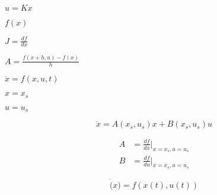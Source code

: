 \documentclass{article}
\begin{document}
$ u = K x $
\pagebreak

$ f(x) $
\pagebreak

$ J = \frac{df}{dx} $
\pagebreak

$ A = \frac{f(x+h,u) - f(x)}{h} $
\pagebreak

$ \dot{x} = f(x,u,t) $
\pagebreak

$ x=x_s $
\pagebreak

$ u=u_s $
\pagebreak

\[ \dot{x} = A(x_s, u_s) x + B(x_s, u_s) u \]
\pagebreak

\[ \begin{aligned} A &= \frac{df}{dx} |_{x=x_s, u=u_s} \\ B &= \frac{df}{du} |_{x=x_s, u=u_s} \end{aligned} \]
\pagebreak

\[ \dot(x) = f(x(t),u(t)) \]
\pagebreak
\end{document}
